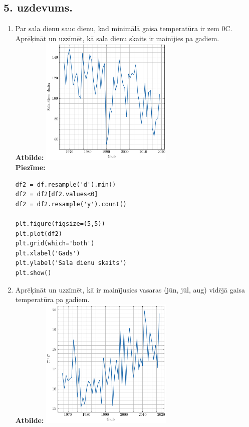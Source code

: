 \documentclass[12pt]{article}
\begin{document}
\subsection*{5. uzdevums.}
    \begin{enumerate}
        \item Par sala dienu sauc dienu, kad minimālā gaisa temperatūra ir zem 0C. Aprēķināt un uzzīmēt, kā sala dienu skaits ir mainījies pa gadiem.\\

        \textbf{Atbilde:} \includegraphics[width=0.5\textwidth]{1.uzd.png}\\

        \textbf{Piezīme:}
        \begin{verbatim}
df2 = df.resample('d').min()
df2 = df2[df2.values<0]
df2 = df2.resample('y').count()
            
plt.figure(figsize=(5,5))
plt.plot(df2)
plt.grid(which='both')
plt.xlabel('Gads')
plt.ylabel('Sala dienu skaits')
plt.show()
        \end{verbatim}

        \item Aprēķināt un uzzīmēt, kā ir mainījusies vasaras (jūn, jūl, aug) vidējā gaisa temperatūra pa gadiem.\\

        \textbf{Atbilde:} \includegraphics[width=0.5\textwidth]{2.udz.png}\\


\end{enumerate}
\end{document}
